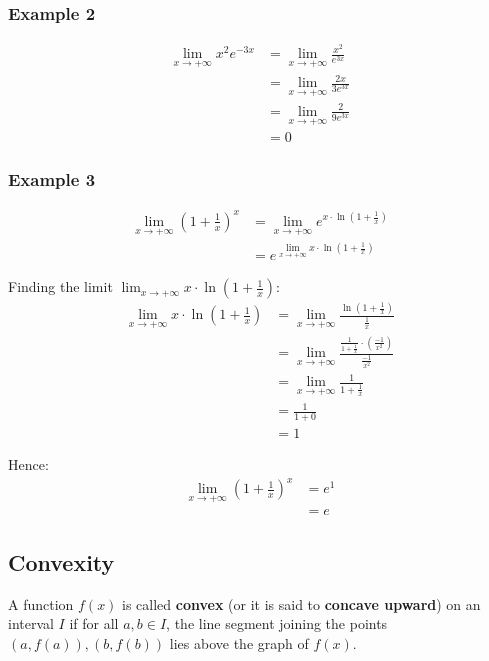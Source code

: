 \documentclass[11pt]{article}
\begin{document}
\subsubsection{Example 2}
\label{sec:orgb0e7649}
\begin{align*}
\lim_{x \rightarrow +\infty} x^2 e^{-3x} &= \lim_{x \rightarrow +\infty} \frac{x^2}{e^{3x}} \\
&= \lim_{x \rightarrow +\infty} \frac{2x}{3e^{3x}} \\
&= \lim_{x \rightarrow +\infty} \frac{2}{9e^{3x}} \\
&= 0
\end{align*}
\subsubsection{Example 3}
\label{sec:orge2bcd7b}
\begin{align*}
\lim_{x \rightarrow +\infty} \left(1 + \frac{1}{x} \right)^{x} &= \lim_{x \rightarrow +\infty} e^{x \cdot \ln \left( 1 + \frac{1}{x} \right)} \\
&= e^{\lim_{x \rightarrow +\infty} x \cdot \ln \left(1 + \frac{1}{x} \right)}
\end{align*}

Finding the limit \(\lim_{x \rightarrow +\infty} x \cdot \ln \left(1 + \frac{1}{x} \right)\):
\begin{align*}
\lim_{x \rightarrow +\infty} x \cdot \ln \left(1 + \frac{1}{x} \right) &= \lim_{x \rightarrow +\infty} \frac{\ln \left(1 + \frac{1}{x} \right)}{\frac{1}{x}} \\
&= \lim_{x \rightarrow +\infty} \frac{\frac{1}{1 + \frac{1}{x}} \cdot \left( \frac{-1}{x^2} \right)}{\frac{-1}{x^2}} \\
&= \lim_{x \rightarrow +\infty} \frac{1}{1 + \frac{1}{x}} \\
&= \frac{1}{1 + 0} \\
&= 1
\end{align*}

Hence:
\begin{align*}
\lim_{x \rightarrow +\infty} \left(1 + \frac{1}{x} \right)^{x} &= e^{1} \\
&= e
\end{align*}

\newpage
\subsection{Convexity}
\label{sec:org7751ac8}
A function \(f(x)\) is called \textbf{convex} (or it is said to \textbf{concave upward}) on an interval \(I\) if for all \(a, b \in I\), the line segment joining the points \((a, f(a)), (b, f(b))\) lies above the graph of \(f(x)\).
\end{document}
